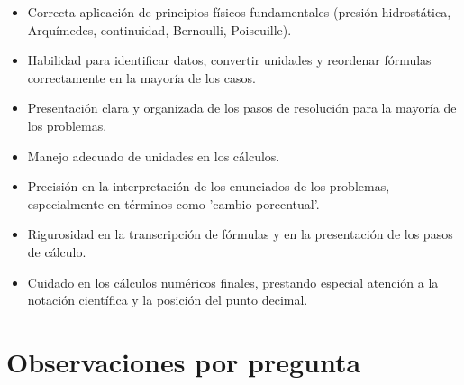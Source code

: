 \documentclass[11pt,a4paper]{article}
\begin{document}
\vspace{4pt}
\begin{minipage}[t]{0.48\linewidth}
  \begin{tcolorbox}[cajaFortaleza, title={Fortalezas}]
\begin{itemize}[leftmargin=1.5em, itemsep=2pt]
  \item Correcta aplicación de principios físicos fundamentales (presión hidrostática, Arquímedes, continuidad, Bernoulli, Poiseuille).
  \item Habilidad para identificar datos, convertir unidades y reordenar fórmulas correctamente en la mayoría de los casos.
  \item Presentación clara y organizada de los pasos de resolución para la mayoría de los problemas.
  \item Manejo adecuado de unidades en los cálculos.
\end{itemize}
  \end{tcolorbox}
\end{minipage}
\hfill
\begin{minipage}[t]{0.48\linewidth}
  \begin{tcolorbox}[cajaMejora, title={Areas de mejora}]
\begin{itemize}[leftmargin=1.5em, itemsep=2pt]
  \item Precisión en la interpretación de los enunciados de los problemas, especialmente en términos como 'cambio porcentual'.
  \item Rigurosidad en la transcripción de fórmulas y en la presentación de los pasos de cálculo.
  \item Cuidado en los cálculos numéricos finales, prestando especial atención a la notación científica y la posición del punto decimal.
\end{itemize}
  \end{tcolorbox}
\end{minipage}

\section*{Observaciones por pregunta}
\end{document}

